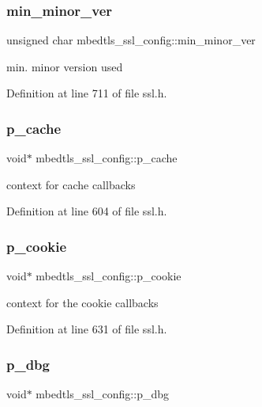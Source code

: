 \subsubsection{\texorpdfstring{min\+\_\+minor\+\_\+ver}{min\_minor\_ver}}
{\footnotesize\ttfamily unsigned char mbedtls\+\_\+ssl\+\_\+config\+::min\+\_\+minor\+\_\+ver}

min. minor version used 

Definition at line 711 of file ssl.\+h.

\mbox{\label{structmbedtls__ssl__config_ac5f5d3d7a788e65c722db381c66ecb24}} 
\subsubsection{\texorpdfstring{p\+\_\+cache}{p\_cache}}
{\footnotesize\ttfamily void$\ast$ mbedtls\+\_\+ssl\+\_\+config\+::p\+\_\+cache}

context for cache callbacks 

Definition at line 604 of file ssl.\+h.

\mbox{\label{structmbedtls__ssl__config_a227d50ad74b96adcc59a8fdee0f618a4}} 
\subsubsection{\texorpdfstring{p\+\_\+cookie}{p\_cookie}}
{\footnotesize\ttfamily void$\ast$ mbedtls\+\_\+ssl\+\_\+config\+::p\+\_\+cookie}

context for the cookie callbacks 

Definition at line 631 of file ssl.\+h.

\mbox{\label{structmbedtls__ssl__config_ad591b46fdb117d844c0a5f7366423c48}} 
\subsubsection{\texorpdfstring{p\+\_\+dbg}{p\_dbg}}
{\footnotesize\ttfamily void$\ast$ mbedtls\+\_\+ssl\+\_\+config\+::p\+\_\+dbg}

